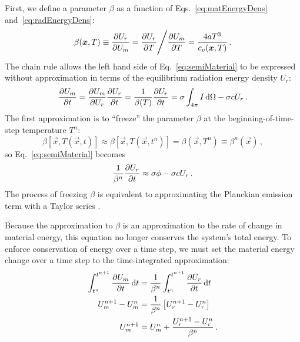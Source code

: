 First, we define a parameter $\beta$ as a function of
Eqs.~\eqref{eq:matEnergyDens} and~\eqref{eq:radEnergyDens}:
\begin{equation} \label{eq:beta}
  \beta(\bm{x}, T) \equiv \frac{\partial U_r}{\partial U_m} 
  = \frac{\partial U_r}{\partial T} \Bigg/ \frac{\partial U_m}{\partial T}
  = \frac{4 a T^3}{c_v(\bm{x}, T)} \,.
\end{equation}
The chain rule allows the left hand side of Eq.~\eqref{eq:semiMaterial} to be
expressed without approximation in terms of the equilibrium radiation energy
density $U_r$:
\begin{equation*}
  \frac{\partial U_m}{\partial t} = \frac{\partial U_m}{\partial U_r} \frac{\partial U_r}{\partial t} = \frac{1}{\beta(T)}
  \frac{\partial U_r}{\partial t} = \sigma \int_{4\pi}  I \mathop{}\!\mathrm{d} \Omega - \sigma c U_r \,.
\end{equation*}
The first approximation is to ``freeze'' the parameter $\beta$ at the
beginning-of-time-step temperature $T^n$:
\begin{equation*}
  \beta[\vec{x},T(\vec{x},t)] \approx \beta[\vec{x},T(\vec{x},t^n)]
  = \beta(\vec{x}, T^n) \equiv \beta^n(\vec{x})\,,
\end{equation*}
so Eq.~\eqref{eq:semiMaterial} becomes
\begin{equation}\label{eq:frozenBeta}
  \frac{1}{\beta^n}
  \frac{\partial U_r}{\partial t} \approx \sigma \phi - \sigma c U_r \,.
\end{equation}
The process of freezing $\beta$ is equivalent to approximating the
Planckian emission term with a Taylor series \cite{Kno2007}.

Because the approximation to $\beta$ is an approximation to the rate of change
in material energy, this equation no longer conserves the system's total
energy. To enforce conservation of energy over a time step, we must set the
material energy change over a time step to the time-integrated approximation:
\begin{align}
  \nonumber
  \int_{t^n}^{t^{n+1}}  \frac{\partial U_m}{\partial t}\mathop{}\!\mathrm{d} t &= \frac{1}{\beta^n}
  \int_{t^n}^{t^{n+1}} \frac{\partial U_r}{\partial t}\mathop{}\!\mathrm{d} t
  \\
  \nonumber
  U_m^{n+1} - U_m^n &= \frac{1}{\beta^n} \left[ U_r^{n+1} - U_r^n \right]
  \\
  \label{eq:matenConservationUpdate}
  U_m^{n+1} &=  U_m^n + \frac{U_r^{n+1} - U_r^n}{\beta^n}\,.
\end{align}

